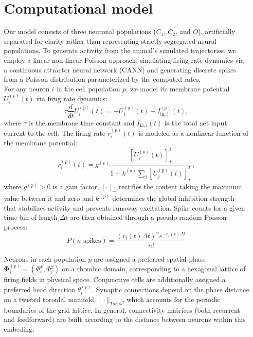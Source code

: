 \documentclass{article}
\begin{document}
\section{Computational model}

Our model consists of three neuronal populations ($C_1$, $C_2$, and $O$), artificially separated for clarity rather than representing strictly segregated neural populations. To generate activity from the animal's simulated trajectories, we employ a linear-non-linear Poisson approach: simulating firing rate dynamics via a continuous attractor neural network (CANN) and generating discrete spikes from a Poisson distribution parameterized by the computed rates.\\

For any neuron $i$ in the cell population $p$, we model its membrane potential $U_i^{(p)}(t)$ via firng rate dynamics:
\begin{equation}
    \tau \frac{d}{dt}U_i^{(p)}(t)=-U_i^{(p)}(t) + I_{\text{in},i}^{(p)}(t),
\end{equation}
\noindent where $\tau$ is the membrane time constant and $I_{\text{in},i}(t)$ is the total net input current to the cell. The firing rate $r_i^{(p)}(t)$ is modeled as a nonlinear function of the membrane potential:
\begin{equation}
    r_i^{(p)}(t)=g^{(p)} \frac{[U_i^{(p)}(t)]_+^2}{1 + k^{(p)} \sum_j [U_j^{(p)}(t)]_+^2},
\end{equation}
\noindent where $g^{(p)}>0$ is a gain factor, $[\cdot]_+$ rectifies the content taking the maximum value between it and zero and $k^{(p)}$ determines the global inhibition strength that stabilizes activity and prevents runaway excitation. Spike counts for a given time bin of length $\Delta t$ are then obtained through a pseudo-random Poisson process:
\begin{equation}
    P(n \text{ spikes})=\frac{(r_i(t)\Delta t)^n e^{-r_i(t)\Delta t}}{n!}
\end{equation}

Neurons in each population $p$ are assigned a preferred spatial phase $\bm \Phi_i^{(p)} = (\Phi_i^x, \Phi_i^y)$ on a rhombic domain, corresponding to a hexagonal lattice of firing fields in physical space. Conjunctive cells are additionally assigned a preferred head direction $\theta_i^{(p)}$. Synaptic connections depend on the phase distance on a twisted toroidal manifold, $||\cdot||_{Torus}$, which accounts for the periodic boundaries of the grid lattice. In general, connectivity matrices (both recurrent and feedforward) are built according to the distance between neurons within this embeding:\\
\end{document}
